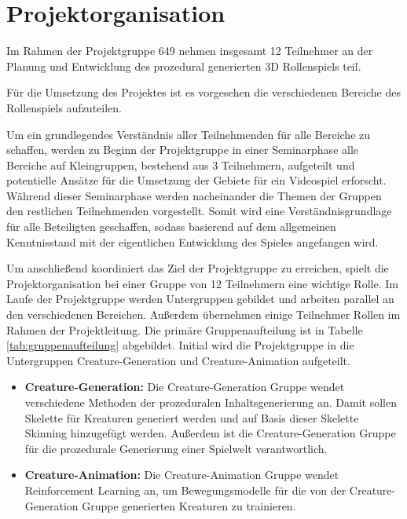\chapter{Projektorganisation}\label{ch:projektorganisation}



Im Rahmen der Projektgruppe 649 nehmen insgesamt 12 Teilnehmer an der Planung und Entwicklung des prozedural generierten 3D Rollenspiels teil. 

Für die Umsetzung des Projektes ist es vorgesehen die verschiedenen Bereiche des Rollenspiels aufzuteilen.

Um ein grundlegendes Verständnis aller Teilnehmenden für alle Bereiche zu schaffen, werden zu Beginn der Projektgruppe in einer Seminarphase alle Bereiche auf Kleingruppen, bestehend aus 3 Teilnehmern, aufgeteilt und potentielle Ansätze für die Umsetzung der Gebiete für ein Videospiel erforscht. Während dieser Seminarphase werden nacheinander die Themen der Gruppen den restlichen Teilnehmenden vorgestellt. Somit wird eine Verständnisgrundlage für alle Beteiligten geschaffen, sodass basierend auf dem allgemeinen Kenntnisstand mit der eigentlichen Entwicklung des Spieles angefangen wird. 

Um anschließend koordiniert das Ziel der Projektgruppe zu erreichen, spielt die Projektorganisation bei einer Gruppe von 12 Teilnehmern eine wichtige Rolle. Im Laufe der Projektgruppe werden Untergruppen gebildet und arbeiten parallel an den verschiedenen Bereichen. Außerdem übernehmen einige Teilnehmer Rollen im Rahmen der Projektleitung. Die primäre Gruppenaufteilung ist in Tabelle \ref{tab:gruppenaufteilung} abgebildet. Initial wird die Projektgruppe in die Untergruppen Creature-Generation und Creature-Animation aufgeteilt.

\begin{itemize}
	\item \textbf{Creature-Generation: } Die Creature-Generation Gruppe wendet verschiedene Methoden der prozeduralen Inhaltsgenerierung an. Damit sollen Skelette für Kreaturen generiert werden und auf Basis dieser Skelette Skinning hinzugefügt werden. Außerdem ist die Creature-Generation Gruppe für die prozedurale Generierung einer Spielwelt verantwortlich.
	\item \textbf{Creature-Animation: } Die Creature-Animation Gruppe wendet Reinforcement Learning an, um Bewegungsmodelle für die von der Creature-Generation Gruppe generierten Kreaturen zu trainieren. 
\end{itemize}

